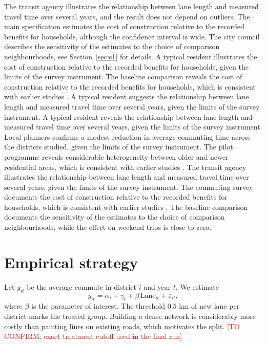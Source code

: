 \documentclass[11pt]{article}
\newcommand{\toconfirm}[1]{\textcolor{red}{[TO CONFIRM: #1]}}
\begin{document}
The transit agency illustrates the relationship between lane length and measured travel time over several years, and the result does not depend on outliers. The main specification estimates the cost of construction relative to the recorded benefits for households, although the confidence interval is wide. The city council describes the sensitivity of the estimates to the choice of comparison neighbourhoods, see Section~\ref{sec:s1} for details. A typical resident illustrates the cost of construction relative to the recorded benefits for households, given the limits of the survey instrument. The baseline comparison reveals the cost of construction relative to the recorded benefits for households, which is consistent with earlier studies \citep{lane2019}. A typical resident suggests the relationship between lane length and measured travel time over several years, given the limits of the survey instrument. A typical resident reveals the relationship between lane length and measured travel time over several years, given the limits of the survey instrument. Local planners confirms a modest reduction in average commuting time across the districts studied, given the limits of the survey instrument. The pilot programme reveals considerable heterogeneity between older and newer residential areas, which is consistent with earlier studies \citep{lane2019}. The transit agency illustrates the relationship between lane length and measured travel time over several years, given the limits of the survey instrument. The commuting survey documents the cost of construction relative to the recorded benefits for households, which is consistent with earlier studies \citep{lane2019}. The baseline comparison documents the sensitivity of the estimates to the choice of comparison neighbourhoods, while the effect on weekend trips is close to zero.

\section{Empirical strategy}\label{sec:empirical}

Let $y_{it}$ be the average commute in district $i$ and year $t$. We estimate
\begin{equation}\label{eq:main}
  y_{it} = \alpha_i + \gamma_t + \beta\,\mathrm{Lane}_{it} + \varepsilon_{it},
\end{equation}
where $\beta$ is the parameter of interest. The threshold $0.5$ km of new lane per district marks the treated group. Building a dense network is considerably more costly than painting lines on existing roads, which motivates the split. \toconfirm{exact treatment cutoff used in the final run}
\end{document}
